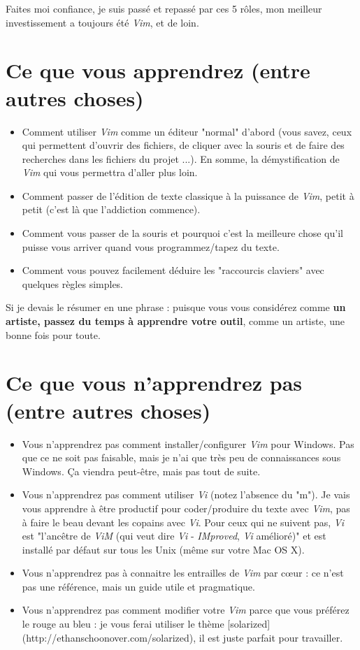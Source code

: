 Faites moi confiance, je suis passé et repassé par ces 5 rôles, mon meilleur investissement a toujours été \emph{Vim}, et de loin.

\section{Ce que vous apprendrez (entre autres choses)}

\begin{itemize}
    \item Comment utiliser \emph{Vim} comme un éditeur "normal" d'abord (vous savez, ceux qui permettent d'ouvrir des fichiers, de cliquer avec la souris et de faire des recherches dans les fichiers du projet ...). En somme, la démystification de \emph{Vim} qui vous permettra d'aller plus loin.
    \item Comment passer de l'édition de texte classique à la puissance de \emph{Vim}, petit à petit (c'est là que l'addiction commence).
    \item Comment vous passer de la souris et pourquoi c'est la meilleure chose qu'il puisse vous arriver quand vous programmez/tapez du texte.
    \item Comment vous pouvez facilement déduire les "raccourcis claviers" avec quelques règles simples.
\end{itemize}

Si je devais le résumer en une phrase : puisque vous vous considérez comme {\bf un artiste, passez du temps à apprendre votre outil}, comme un artiste, une bonne fois pour toute.

\section{Ce que vous n'apprendrez pas (entre autres choses)}

\begin{itemize}
    \item Vous n'apprendrez pas comment installer/configurer {\em Vim} pour Windows. Pas que ce ne soit pas faisable, mais je n'ai que très peu de connaissances sous Windows. Ça viendra peut-être, mais pas tout de suite.
    \item Vous n'apprendrez pas comment utiliser \emph{Vi} (notez l'absence du "m"). Je vais vous apprendre à être productif pour coder/produire du texte avec \emph{Vim}, pas à faire le beau devant les copains avec \emph{Vi}. Pour ceux qui ne suivent pas, \emph{Vi} est "l'ancêtre de \emph{ViM} (qui veut dire \emph{Vi} - \emph{IMproved}, \emph{Vi} amélioré)" et est installé par défaut sur tous les Unix (même sur votre Mac OS X).
    \item Vous n'apprendrez pas à connaitre les entrailles de \emph{Vim} par c\oe ur : ce n'est pas une référence, mais un guide utile et pragmatique.
    \item Vous n'apprendrez pas comment modifier votre \emph{Vim} parce que vous préférez le rouge au bleu : je vous ferai utiliser le thème [solarized](http://ethanschoonover.com/solarized), il est juste parfait pour travailler.
\end{itemize}

